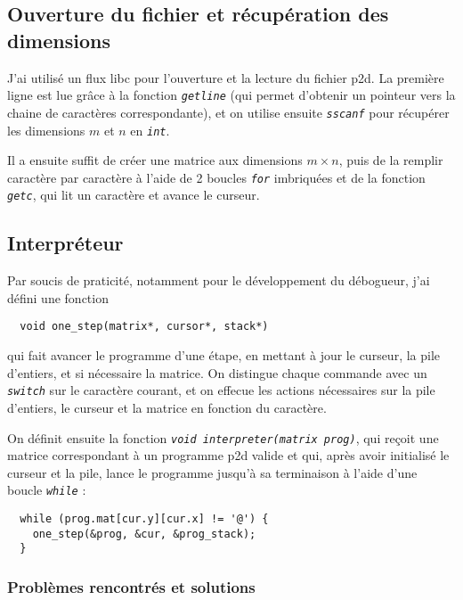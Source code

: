 \documentclass[a4paper,11pt]{article}
\newcommand{\code}[1]{{\itshape\lstinline{#1}}}
\begin{document}
\subsection*{Ouverture du fichier et récupération des dimensions}

J'ai utilisé un flux libc pour l'ouverture et la lecture du fichier p2d. La première ligne est lue grâce à la fonction \code{getline} (qui permet d'obtenir un pointeur vers la chaine de caractères correspondante), et on utilise ensuite \code{sscanf} pour récupérer les dimensions $m$ et $n$ en \code{int}.

Il a ensuite suffit de créer une matrice aux dimensions $m \times n$, puis de la remplir caractère par caractère à l'aide de 2 boucles \code{for} imbriquées et de la fonction \code{getc}, qui lit un caractère et avance le curseur.


\subsection*{Interpréteur}

Par soucis de praticité, notamment pour le développement du débogueur, j'ai défini une fonction
\begin{lstlisting}
  void one_step(matrix*, cursor*, stack*)
\end{lstlisting}
qui fait avancer le programme d'une étape, en mettant à jour le curseur, la pile d'entiers, et si nécessaire la matrice.
On distingue chaque commande avec un \code{switch} sur le caractère courant, et on effecue les actions nécessaires sur la pile d'entiers, le curseur et la matrice en fonction du caractère.

On définit ensuite la fonction \code{void interpreter(matrix prog)}, qui reçoit une matrice correspondant à un programme p2d valide et qui, après avoir initialisé le curseur et la pile, lance le programme jusqu'à sa terminaison à l'aide d'une boucle \code{while} :
\begin{lstlisting}
  while (prog.mat[cur.y][cur.x] != '@') {
    one_step(&prog, &cur, &prog_stack);
  }
\end{lstlisting}

\subsubsection*{Problèmes rencontrés et solutions}
\end{document}
